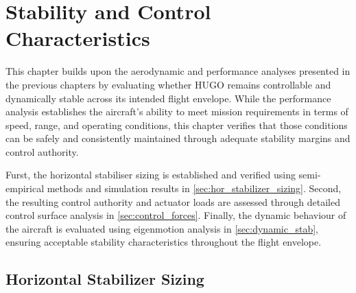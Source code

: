 \chapter{Stability and Control Characteristics}
\label{ch:scc}






This chapter builds upon the aerodynamic and performance analyses presented in the previous chapters by evaluating whether HUGO remains controllable and dynamically stable across its intended flight envelope. While the performance analysis establishes the aircraft’s ability to meet mission requirements in terms of speed, range, and operating conditions, this chapter verifies that those conditions can be safely and consistently maintained through adequate stability margins and control authority.

Furst, the horizontal stabiliser sizing is established and verified using semi-empirical methods and simulation results in \autoref{sec:hor_stabilizer_sizing}. Second, the resulting control authority and actuator loads are assessed through detailed control surface analysis in \autoref{sec:control_forces}. Finally, the dynamic behaviour of the aircraft is evaluated using eigenmotion analysis in \autoref{sec:dynamic_stab}, ensuring acceptable stability characteristics throughout the flight envelope.

\section{Horizontal Stabilizer Sizing}
\label{sec:hor_stabilizer_sizing}

